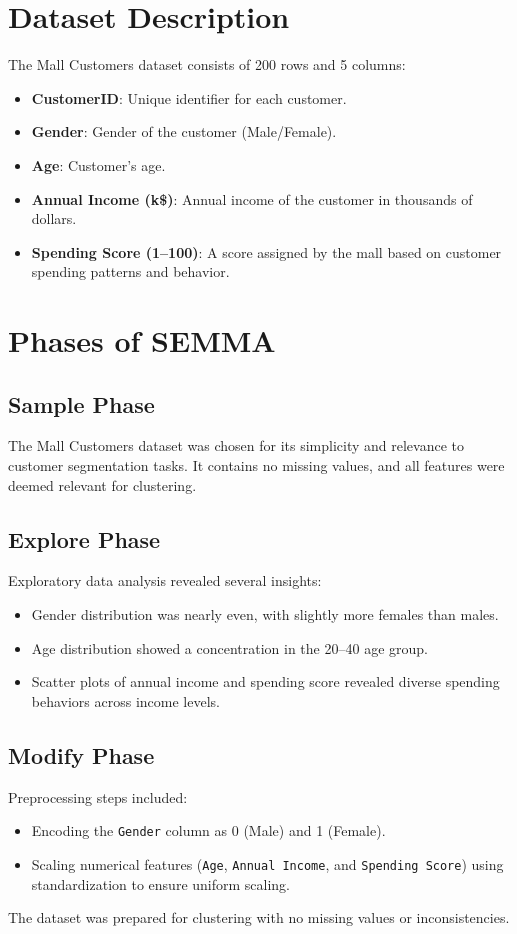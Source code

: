 \documentclass[12pt]{article}
\begin{document}
\section{Dataset Description}
The Mall Customers dataset consists of 200 rows and 5 columns:
\begin{itemize}
    \item \textbf{CustomerID}: Unique identifier for each customer.
    \item \textbf{Gender}: Gender of the customer (Male/Female).
    \item \textbf{Age}: Customer's age.
    \item \textbf{Annual Income (k\$)}: Annual income of the customer in thousands of dollars.
    \item \textbf{Spending Score (1–100)}: A score assigned by the mall based on customer spending patterns and behavior.
\end{itemize}

\section{Phases of SEMMA}

\subsection{Sample Phase}
The Mall Customers dataset was chosen for its simplicity and relevance to customer segmentation tasks. It contains no missing values, and all features were deemed relevant for clustering.

\subsection{Explore Phase}
Exploratory data analysis revealed several insights:
\begin{itemize}
    \item Gender distribution was nearly even, with slightly more females than males.
    \item Age distribution showed a concentration in the 20–40 age group.
    \item Scatter plots of annual income and spending score revealed diverse spending behaviors across income levels.
\end{itemize}

\subsection{Modify Phase}
Preprocessing steps included:
\begin{itemize}
    \item Encoding the \texttt{Gender} column as 0 (Male) and 1 (Female).
    \item Scaling numerical features (\texttt{Age}, \texttt{Annual Income}, and \texttt{Spending Score}) using standardization to ensure uniform scaling.
\end{itemize}
The dataset was prepared for clustering with no missing values or inconsistencies.
\end{document}
